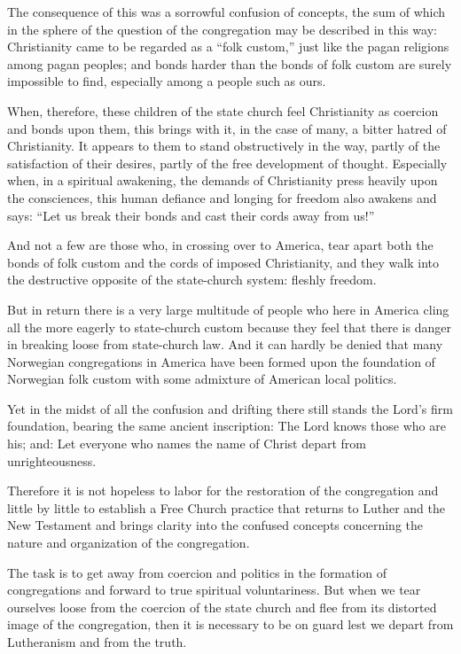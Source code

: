 The consequence of this was a sorrowful confusion of concepts, the sum of which in the sphere of the question of the congregation may be described in this way: Christianity came to be regarded as a “folk custom,” just like the pagan religions among pagan peoples; and bonds harder than the bonds of folk custom are surely impossible to find, especially among a people such as ours.

When, therefore, these children of the state church feel Christianity as coercion and bonds upon them, this brings with it, in the case of many, a bitter hatred of Christianity. It appears to them to stand obstructively in the way, partly of the satisfaction of their desires, partly of the free development of thought. Especially when, in a spiritual awakening, the demands of Christianity press heavily upon the consciences, this human defiance and longing for freedom also awakens and says: “Let us break their bonds and cast their cords away from us!”

And not a few are those who, in crossing over to America, tear apart both the bonds of folk custom and the cords of imposed Christianity, and they walk into the destructive opposite of the state-church system: fleshly freedom.

But in return there is a very large multitude of people who here in America cling all the more eagerly to state-church custom because they feel that there is danger in breaking loose from state-church law. And it can hardly be denied that many Norwegian congregations in America have been formed upon the foundation of Norwegian folk custom with some admixture of American local politics.

Yet in the midst of all the confusion and drifting there still stands the Lord’s firm foundation, bearing the same ancient inscription: The Lord knows those who are his; and: Let everyone who names the name of Christ depart from unrighteousness.

Therefore it is not hopeless to labor for the restoration of the congregation and little by little to establish a Free Church practice that returns to Luther and the New Testament and brings clarity into the confused concepts concerning the nature and organization of the congregation.

The task is to get away from coercion and politics in the formation of congregations and forward to true spiritual voluntariness. But when we tear ourselves loose from the coercion of the state church and flee from its distorted image of the congregation, then it is necessary to be on guard lest we depart from Lutheranism and from the truth.

